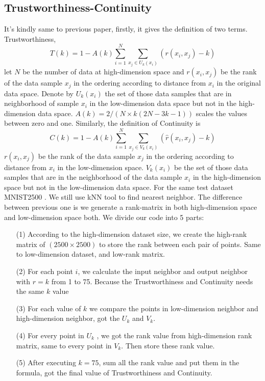 \documentclass[12pt]{article}
\begin{document}
\subsection*{Trustworthiness-Continuity}
It's kindly same to previous paper, firstly, it gives the definition of two terms. Trustworthiness\cite{Trust1}\cite{Trust2},
\begin{equation}
	T(k) = 1-A(k)\sum_{i=1}^{N}\sum_{x_{j}\in U_{k}(x_{i})}(r(x_{i},x_{j})-k)
\end{equation}
let $N$ be the number of data at high-dimension space and $ r(x_{i} , x_{j})$ be the rank of the data sample $x_{j}$ in the ordering according to distance from $x_{i}$ in the original data space. Denote by $U_k(x_{i})$ the set of those data samples that are in neighborhood of sample $x_{i}$ in the low-dimension data space but not in the high-dimension data space. $A(k) = 2/(N\times k (2N - 3k - 1))$ scales the values between zero and one. Similarly, the definition of Continuity is\cite{Trust1}\cite{Trust2}
\begin{equation}
	C(k) = 1-A(k)\sum_{i=1}^{N}\sum_{x_{j}\in V_{k}(x_{i})}(\hat{r}(x_{i},x_{j})-k)
\end{equation}
$r(x_{i} , x_{j} )$ be the rank of the data sample $x_{j}$ in the ordering according to distance from $x_{i}$ in the low-dimension space. $V_k (x_{i})$ be the set of those data samples that are in the neighborhood of the data sample $x_{i}$ in the high-dimension space but not in the low-dimension data space. For the same test dataset MNIST2500 \cite{MNIST}. We still use kNN tool to find nearest neighbor. The difference between previous one is we generate a rank-matrix in both high-dimension space and low-dimension space both.
We divide our code into 5 parts:
\begin{enumerate}
	\item[(1)]According to the high-dimension dataset size, we create the high-rank matrix of $(2500\times2500) $ to store the rank between each pair of points. Same to low-dimension dataset, and low-rank matrix.
	\item[(2)] For each point $ i$, we calculate the input neighbor and output neighbor with $r=k $ from 1 to 75. Because the Trustworthiness and Continuity needs the same $k $ value
	\item[(3)] For each value of $k$ we compare the points in low-dimension neighbor and high-dimension neighbor, got the $U_{k}$ and $V_{k}$.
	\item[(4)] 	For every point in $U_{k}$ , we got the rank value from high-dimension rank matrix, same to every point in $V_{k}$. Then store these rank value.
	\item[(5)] After executing $k=75$, sum all the rank value and put them in the formula, got the final value of Trustworthiness and Continuity.
\end{enumerate}
\hfill
\end{document}
